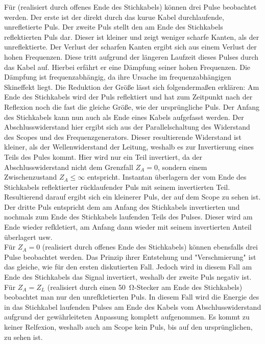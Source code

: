 \documentclass[a4paper,twoside,final]{article}
\begin{document}
Für  (realisiert durch offenes Ende des Stichkabels) können drei Pulse beobachtet werden. Der erste ist der direkt durch das kurue Kabel durchlaufende, unrefletierte Puls. Der zweite Puls stellt den am Ende des Stichkabels reflektierten Puls dar. Dieser ist kleiner und zeigt weniger scharfe Kanten, als der unreflektierte. Der Verlust der scharfen Kanten ergibt sich aus einem Verlust der hohen Frequenzen. Diese tritt aufgrund der längeren Laufzeit dieses Pulses durch das Kabel auf. Hierbei erfährt er eine Dämpfung seiner hohen Frequenzen. Die Dämpfung ist frequenzabhängig, da ihre Ursache im frequenzabhängigen Skineffekt liegt. Die Reduktion der Größe lässt sich folgendermaßen erklären: Am Ende des Stichkabels wird der Puls reflektiert und hat zum Zeitpunkt nach der Reflexion noch die fast die gleiche Größe, wie der ursprüngliche Puls. Der Anfang des Stichkabels kann nun auch als Ende eines Kabels aufgefasst werden. Der Abschlusswiderstand hier ergibt sich aus der Parallelschaltung des Widerstand des Scopes und des Frequenzgenerators. Dieser resultierende Widerstand ist kleiner, als der Wellenwiderstand der Leitung, weshalb es zur Invertierung eines Teils des Pules kommt. Hier wird nur ein Teil invertiert, da der Abschlusswiderstand nicht dem Grenzfall $Z_A = 0$, sondern einem Zwischenzustand $Z_A \leq \infty$ entspricht. Instantan überlagern der vom Ende des Stichkabels reflektierter rücklaufender Puls mit seinem invertierten Teil. Resultierend darauf ergibt sich ein kleinerer Puls, der auf dem Scope zu sehen ist. Der dritte Puls entspricht dem am Anfang des Stichkabels invertierten und nochmals zum Ende des Stichkabels laufenden Teils des Pulses. Dieser wird am Ende wieder refkletiert, am Anfang dann wieder mit seinem invertierten Anteil überlagert usw. \\

Für \textbf{$Z_A = 0$} (realisiert durch offenes Ende des Stichkabels) können ebensfalls drei Pulse beobachtet werden. Das Prinzip ihrer Entstehung und "Verschmierung" ist das gleiche, wie für den ersten diskutierten Fall. Jedoch wird in diesem Fall am Ende des Stichkabels das Signal invertiert, weshalb der zweite Puls negativ ist. \\

Für \textbf{$Z_A = Z_L$} (realisiert durch einen \SI{50}{\ohm}-Stecker am Ende des Stichkabels) beobachtet man nur den unrefkletierten Puls. In diesem Fall wird die Energie des in das Stichkabel laufenden Pulses am Ende des Kabels vom Abschlusswiderstand aufgrund der gewährleiteten Anpassung komplett aufgenommen. Es kommt zu keiner Relfexion, weshalb auch am Scope kein Puls, bis auf den ursprünglichen, zu sehen ist. \\
\end{document}
